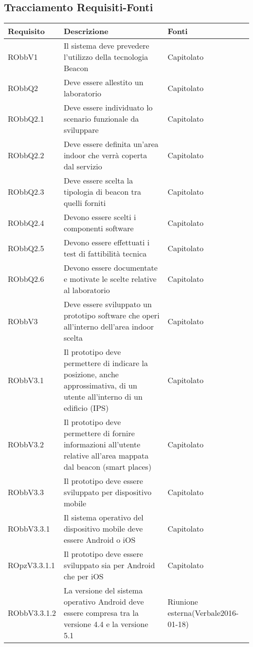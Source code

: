 \documentclass[../AnalisiDeiRequisiti.tex]{subfiles}
\begin{document}
\subsection{Tracciamento Requisiti-Fonti}
\begin{longtabu} to \textwidth {X X[2] X}
	\toprule
	\textbf{Requisito} & \textbf{Descrizione} & \textbf{Fonti}\\
	\midrule
	\endhead
	RObbV1 & Il sistema deve prevedere l'utilizzo della tecnologia Beacon & Capitolato \\ 
	\midrule 
	RObbQ2 & Deve essere allestito un laboratorio & Capitolato \\ 
	\midrule 
	RObbQ2.1 & Deve essere individuato lo scenario funzionale da sviluppare & Capitolato \\ 
	\midrule 
	RObbQ2.2 & Deve essere definita un'area indoor che verrà coperta dal servizio & Capitolato \\ 
	\midrule 
	RObbQ2.3 & Deve essere scelta la tipologia di beacon tra quelli forniti & Capitolato \\ 
	\midrule 
	RObbQ2.4 & Devono essere scelti i componenti software & Capitolato \\ 
	\midrule 
	RObbQ2.5 & Devono essere effettuati i test di fattibilità tecnica & Capitolato \\ 
	\midrule 
	RObbQ2.6 & Devono essere documentate e motivate le scelte relative al laboratorio & Capitolato \\ 
	\midrule 
	RObbV3 & Deve essere sviluppato un prototipo software che operi all'interno dell'area indoor scelta & Capitolato \\ 
	\midrule 
	RObbV3.1 & Il prototipo deve permettere di indicare la posizione, anche approssimativa, di un utente all'interno di un edificio (IPS) & Capitolato \\ 
	\midrule 
	RObbV3.2 & Il prototipo deve permettere di fornire informazioni all'utente relative all'area mappata dal beacon (smart places) & Capitolato \\ 
	\midrule 
	RObbV3.3 & Il prototipo deve essere sviluppato per dispositivo mobile & Capitolato \\ 
	\midrule
	RObbV3.3.1 & Il sistema operativo del dispositivo mobile deve essere Android o iOS & Capitolato \\ 
	\midrule 
	ROpzV3.3.1.1 & Il prototipo deve essere sviluppato sia per Android che per iOS & Capitolato \\ 
	\midrule 
	RObbV3.3.1.2 & La versione del sistema operativo Android deve essere compresa tra la versione 4.4 e la versione 5.1 & Riunione esterna(Verbale2016-01-18) \\ 

\end{longtabu}
\end{document}
